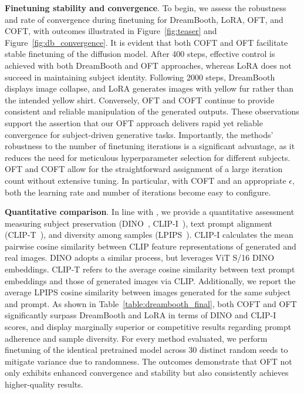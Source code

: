 {\textbf{Finetuning stability and convergence}. To begin, we assess the robustness and rate of convergence during finetuning for DreamBooth, LoRA, OFT, and COFT, with outcomes illustrated in Figure~\ref{fig:teaser} and Figure~\ref{fig:db_convergence}. It is evident that both COFT and OFT facilitate stable finetuning of the diffusion model. After 400 steps, effective control is achieved with both DreamBooth and OFT approaches, whereas LoRA does not succeed in maintaining subject identity. Following 2000 steps, DreamBooth displays image collapse, and LoRA generates images with yellow fur rather than the intended yellow shirt. Conversely, OFT and COFT continue to provide consistent and reliable manipulation of the generated outputs. These observations support the assertion that our OFT approach delivers rapid yet reliable convergence for subject-driven generative tasks. Importantly, the methods' robustness to the number of finetuning iterations is a significant advantage, as it reduces the need for meticulous hyperparameter selection for different subjects. OFT and COFT allow for the straightforward assignment of a large iteration count without extensive tuning. In particular, with COFT and an appropriate $\epsilon$, both the learning rate and number of iterations become easy to configure.

\textbf{Quantitative comparison}. In line with \cite{ruiz2023dreambooth}, we provide a quantitative assessment measuring subject preservation (DINO~\cite{caron2021emerging}, CLIP-I~\cite{radford2021learning}), text prompt alignment (CLIP-T~\cite{radford2021learning}), and diversity among samples (LPIPS~\cite{zhang2018unreasonable}). CLIP-I calculates the mean pairwise cosine similarity between CLIP feature representations of generated and real images. DINO adopts a similar process, but leverages ViT S/16 DINO embeddings. CLIP-T refers to the average cosine similarity between text prompt embeddings and those of generated images via CLIP. Additionally, we report the average LPIPS cosine similarity between images generated for the same subject and prompt. As shown in Table~\ref{table:dreambooth_final}, both COFT and OFT significantly surpass DreamBooth and LoRA in terms of DINO and CLIP-I scores, and display marginally superior or competitive results regarding prompt adherence and sample diversity. For every method evaluated, we perform finetuning of the identical pretrained model across 30 distinct random seeds to mitigate variance due to randomness. The outcomes demonstrate that OFT not only exhibits enhanced convergence and stability but also consistently achieves higher-quality results.

}
